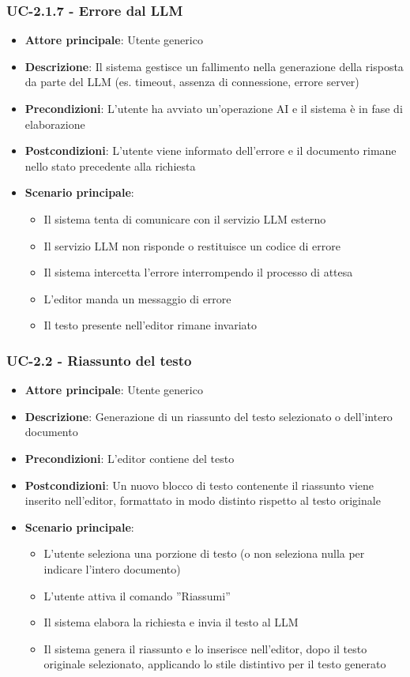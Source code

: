 \documentclass[11pt,a4paper]{article}
\begin{document}
\subsubsection{UC-2.1.7 - Errore dal LLM}
\begin{itemize}
    \item \textbf{Attore principale}: Utente generico
    \item \textbf{Descrizione}: Il sistema gestisce un fallimento nella generazione della risposta da parte del LLM (es. timeout, assenza di connessione, errore server)
    \item \textbf{Precondizioni}: L'utente ha avviato un'operazione AI e il sistema è in fase di elaborazione
    \item \textbf{Postcondizioni}: L’utente viene informato dell'errore e il documento rimane nello stato precedente alla richiesta
    \item \textbf{Scenario principale}:
    \begin{itemize}
        \item Il sistema tenta di comunicare con il servizio LLM esterno
        \item Il servizio LLM non risponde o restituisce un codice di errore
        \item Il sistema intercetta l'errore interrompendo il processo di attesa
        \item L’editor manda un messaggio di errore
        \item Il testo presente nell’editor rimane invariato
    \end{itemize}
\end{itemize}

\subsubsection{UC-2.2 - Riassunto del testo}
\begin{itemize}
    \item \textbf{Attore principale}: Utente generico
    \item \textbf{Descrizione}: Generazione di un riassunto del testo selezionato o dell’intero documento
    \item \textbf{Precondizioni}: L’editor contiene del testo
    \item \textbf{Postcondizioni}: Un nuovo blocco di testo contenente il riassunto viene inserito nell’editor, formattato in modo distinto rispetto al testo originale
    \item \textbf{Scenario principale}:
    \begin{itemize}
        \item L’utente seleziona una porzione di testo (o non seleziona nulla per indicare l'intero documento)
        \item L’utente attiva il comando ”Riassumi”
        \item Il sistema elabora la richiesta e invia il testo al LLM
        \item Il sistema genera il riassunto e lo inserisce nell'editor, dopo il testo originale selezionato, applicando lo stile distintivo per il testo generato
    \end{itemize}
\end{itemize}
\end{document}
